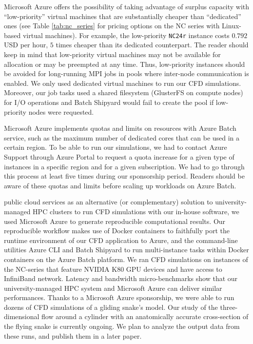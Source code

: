 \documentclass[10pt,journal,compsoc]{IEEEtran}
\begin{document}
Microsoft Azure offers the possibility of taking advantage of surplus capacity with ``low-priority'' virtual machines that are substantially cheaper than ``dedicated'' ones (see Table \ref{tab:nc_series} for pricing options on the NC series with Linux-based virtual machines).
For example, the low-priority \texttt{NC24r} instance costs $0.792$ USD per hour, $5$ times cheaper than its dedicated counterpart.
The reader should keep in mind that low-priority virtual machines may not be available for allocation or may be preempted at any time.
Thus, low-priority instances should be avoided for long-running MPI jobs in pools where inter-node communication is enabled.
We only used dedicated virtual machines to run our CFD simulations.
Moreover, our job tasks used a shared filesystem (GlusterFS on compute nodes) for I/O operations and Batch Shipyard would fail to create the pool if low-priority nodes were requested.

Microsoft Azure implements quotas and limits on resources with Azure Batch service, such as the maximum number of dedicated cores that can be used in a certain region.
To be able to run our simulations, we had to contact Azure Support through Azure Portal to request a quota increase for a given type of instances in a specific region and for a given subscription.
We had to go through this process at least five times during our sponsorship period.
Readers should be aware of these quotas and limits before scaling up workloads on Azure Batch.

\bigskip

 public cloud services as an alternative (or complementary) solution to university-managed HPC clusters to run CFD simulations with our in-house software, we used Microsoft Azure to generate reproducible computational results.
Our reproducible workflow makes use of Docker containers to faithfully port the runtime environment of our CFD application to Azure,
and the command-line utilities Azure CLI and Batch Shipyard to run multi-instance tasks within Docker containers on the Azure Batch platform.
We ran CFD simulations on instances of the NC-series that feature NVIDIA K80 GPU devices and have access to InfiniBand network.
Latency and bandwidth micro-benchmarks show that our university-managed HPC system and Microsoft Azure can deliver similar performances.
Thanks to a Microsoft Azure sponsorship, we were able to run dozens of CFD simulations of a gliding snake's model.
Our study of the three-dimensional flow around a cylinder with an anatomically accurate cross-section of the flying snake is currently ongoing. 
We plan to analyze the output data from these runs, and publish them in a later paper.
\end{document}
